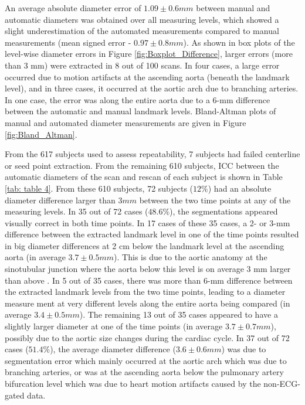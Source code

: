 An average absolute diameter error of $1.09 \pm 0.6 mm$ between manual and automatic diameters was obtained over all measuring levels, which 
showed a slight underestimation of the automated measurements compared to manual measurements (mean signed error -  $0.97 \pm 0.8 mm$). As shown in box plots of the level-wise diameter errors in Figure \cref{fig:Boxplot_Difference}, larger errors (more than 3 mm) were extracted in 8 out of 100 scans. In four cases, a large error occurred due to motion artifacts at the ascending aorta (beneath the landmark level), and in three cases, it occurred at the aortic arch due to branching arteries. In one case, the error was along the entire aorta due to a 6-mm difference between the automatic and manual landmark levels. Bland-Altman plots of manual and automated diameter measurements are given in Figure \cref{fig:Bland_Altman}.


From the 617 subjects used to assess repeatability, 7 subjects had failed centerline or seed point extraction. From the remaining 610 subjects, ICC between the automatic diameters of the scan and rescan of each subject is shown in Table \cref{tab: table 4}. From these 610 subjects, 72 subjects ($12\%$) had an absolute diameter difference larger than $3 mm$ between the two time points at any of the measuring levels. In 35 out of 72 cases ($48.6\%$), the segmentations appeared visually correct in both time points. In 17 cases of these 35 cases, a 2- or 3-mm difference between the extracted landmark level in one of the time points resulted in big diameter differences at 2 cm below the landmark level at the ascending aorta (in average $3.7 \pm 0.5 mm$). This is due to the aortic anatomy at the sinotubular junction where the aorta below this level is on average 3 mm larger than above \autocite{vriz2013aortic}. In 5 out of 35 cases, there was more than 6-mm difference between the extracted landmark levels from the two time points, leading to a diameter measure ment at very different levels along the entire aorta being compared (in average $3.4 \pm 0.5 mm$). The remaining 13 out of 35 cases appeared to have a slightly larger diameter at one of the time points (in average $3.7 \pm 0.7 mm$), possibly due to the aortic size changes during the cardiac cycle. In 37 out of 72 cases ($51.4\%$), the average diameter difference ($3.6 \pm 0.6 mm$) was due to segmentation error which mainly occurred at the aortic arch which was due to branching arteries, or was at the ascending aorta below the pulmonary artery bifurcation level which was due to heart motion artifacts caused by the non-ECG-gated data.


